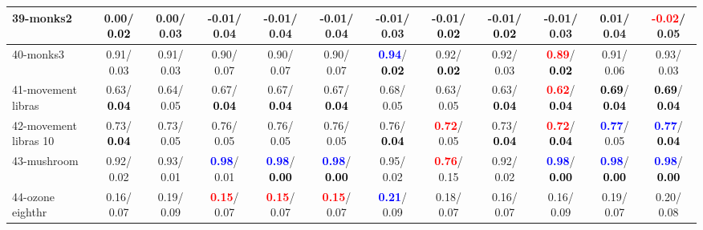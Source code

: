 \begin{table}[h]
\begin{center}
{\begin{tabular}{lc|c|c|c|c|c|c|c|c|c|c}
39-monks2 &   0.00/\textcolor{black}{\textbf{  0.02}} &   0.00/  0.03 &  -0.01/  0.04 &  -0.01/  0.04 &  -0.01/  0.04 &  -0.01/  0.03 &  -0.01/\textcolor{black}{\textbf{  0.02}} &  -0.01/\textcolor{black}{\textbf{  0.02}} &  -0.01/  0.03 &   0.01/  0.04 & \textcolor{red}{\textbf{ -0.02}}/  0.05 \\ \hline
40-monks3 &   0.91/  0.03 &   0.91/  0.03 &   0.90/  0.07 &   0.90/  0.07 &   0.90/  0.07 & \textcolor{blue}{\textbf{  0.94}}/\textcolor{black}{\textbf{  0.02}} &   0.92/\textcolor{black}{\textbf{  0.02}} &   0.92/  0.03 & \textcolor{red}{\textbf{  0.89}}/\textcolor{black}{\textbf{  0.02}} &   0.91/  0.06 &   0.93/  0.03 \\
41-movement libras &   0.63/\textcolor{black}{\textbf{  0.04}} &   0.64/  0.05 &   0.67/\textcolor{black}{\textbf{  0.04}} &   0.67/\textcolor{black}{\textbf{  0.04}} &   0.67/\textcolor{black}{\textbf{  0.04}} &   0.68/  0.05 &   0.63/  0.05 &   0.63/\textcolor{black}{\textbf{  0.04}} & \textcolor{red}{\textbf{  0.62}}/\textcolor{black}{\textbf{  0.04}} & \textcolor{black}{\textbf{  0.69}}/\textcolor{black}{\textbf{  0.04}} & \textcolor{black}{\textbf{  0.69}}/\textcolor{black}{\textbf{  0.04}} \\
42-movement libras 10 &   0.73/\textcolor{black}{\textbf{  0.04}} &   0.73/  0.05 &   0.76/  0.05 &   0.76/  0.05 &   0.76/  0.05 &   0.76/\textcolor{black}{\textbf{  0.04}} & \textcolor{red}{\textbf{  0.72}}/  0.05 &   0.73/\textcolor{black}{\textbf{  0.04}} & \textcolor{red}{\textbf{  0.72}}/\textcolor{black}{\textbf{  0.04}} & \textcolor{blue}{\textbf{  0.77}}/  0.05 & \textcolor{blue}{\textbf{  0.77}}/\textcolor{black}{\textbf{  0.04}} \\
43-mushroom &   0.92/  0.02 &   0.93/  0.01 & \textcolor{blue}{\textbf{  0.98}}/  0.01 & \textcolor{blue}{\textbf{  0.98}}/\textcolor{black}{\textbf{  0.00}} & \textcolor{blue}{\textbf{  0.98}}/\textcolor{black}{\textbf{  0.00}} &   0.95/  0.02 & \textcolor{red}{\textbf{  0.76}}/  0.15 &   0.92/  0.02 & \textcolor{blue}{\textbf{  0.98}}/\textcolor{black}{\textbf{  0.00}} & \textcolor{blue}{\textbf{  0.98}}/\textcolor{black}{\textbf{  0.00}} & \textcolor{blue}{\textbf{  0.98}}/\textcolor{black}{\textbf{  0.00}} \\
44-ozone eighthr &   0.16/  0.07 &   0.19/  0.09 & \textcolor{red}{\textbf{  0.15}}/  0.07 & \textcolor{red}{\textbf{  0.15}}/  0.07 & \textcolor{red}{\textbf{  0.15}}/  0.07 & \textcolor{blue}{\textbf{  0.21}}/  0.09 &   0.18/  0.07 &   0.16/  0.07 &   0.16/  0.09 &   0.19/  0.07 &   0.20/  0.08 \\

\end{tabular}}
\end{center}
\end{table}

